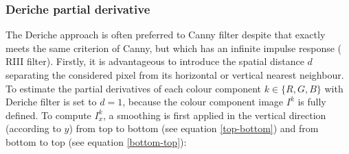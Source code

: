 \documentclass[twoside]{article}
\begin{document}
\subsubsection{Deriche partial derivative}
\label{Deriche partial derivative}
The Deriche approach \cite{deriche_ijcv_1987} is often preferred to Canny filter \cite{canny_ieeetpami_1986} despite that exactly meets the same criterion of Canny, but which has an infinite impulse response ( RIII filter). 
Firstly, it is advantageous to introduce the spatial distance $d$ separating the considered pixel from its horizontal or vertical nearest neighbour.  
To estimate the partial derivatives of each colour component $k \in \{R,G,B\}$ with Deriche filter is set to $d=1$, because the colour component image $I^k$ is fully defined.
To compute $I^k_x$, a smoothing is first applied in the vertical direction (according to $y$) from top to bottom (see equation \eqref{top-bottom}) and from bottom to top (see equation \eqref{bottom-top}): 
\end{document}
